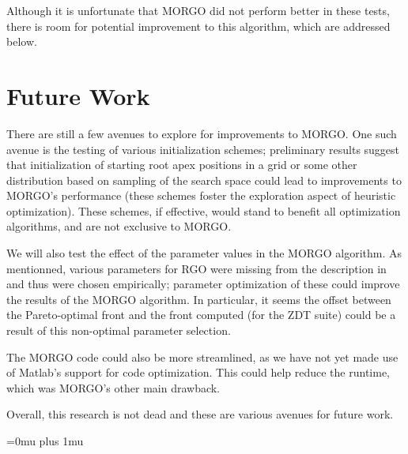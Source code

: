 \documentclass[letterpaper, 10 pt, conference]{ieeeconf}  %
\begin{document}
Although it is unfortunate that MORGO did not perform better in these tests, there is room for potential improvement to this algorithm, which are addressed below.   

\section{Future Work}

There are still a few avenues to explore for improvements to MORGO. One such avenue is the testing of various initialization schemes; preliminary results suggest that initialization of starting root apex positions in a grid or some other distribution based on sampling of the search space could lead to improvements to MORGO's performance (these schemes foster the exploration aspect of heuristic optimization). These schemes, if effective, would stand to benefit all optimization algorithms, and are not exclusive to MORGO. 

We will also test the effect of the parameter values in the MORGO algorithm.  As mentionned, various parameters for RGO were missing from the description in \cite{RGOPaper} and thus were chosen empirically; parameter optimization of these could improve the results of the MORGO algorithm.  In particular, it seems the offset between the Pareto-optimal front and the front computed (for the ZDT suite) could be a result of this non-optimal parameter selection.  

The MORGO code could also be more streamlined, as we have not yet made use of Matlab's support for code optimization. This could help reduce the runtime, which was MORGO's other main drawback.

Overall, this research is not dead and these are various avenues for future work.  

\Urlmuskip=0mu plus 1mu\relax


\end{document}

